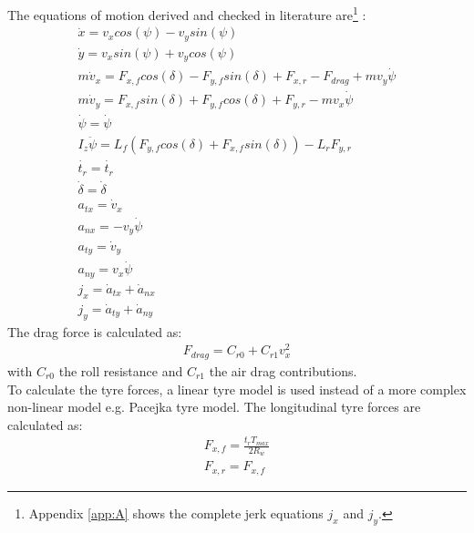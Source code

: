 The equations of motion derived and checked in literature \cite{TongDuySon2019} are\footnote{Appendix \ref{app:A} shows the complete jerk equations $j_x$ and $j_y$.} :
\begin{equation}\label{eq:bicycle_model_eqmotion}
\begin{aligned}
\dot{x} = v_x cos(\psi) - v_y sin(\psi)\\
\dot{y} = v_x sin(\psi) + v_y cos(\psi)\\
m \dot{v}_x = F_{x,f} cos(\delta) - F_{y,f} sin(\delta) + F_{x,r} - F_{drag} + m v_y \dot{\psi}\\
m \dot{v}_y = F_{x,f} sin(\delta) + F_{y,f} cos(\delta) + F_{y,r} - m v_x \dot{\psi}\\
\dot{\psi} = \dot{\psi}\\
I_z \ddot{\psi} = L_f (F_{y,f} cos(\delta) + F_{x,f} sin(\delta)) - L_r F_{y,r}\\
\dot{t_r} = \dot{t_r}\\
\dot{\delta} = \dot{\delta}\\
a_{tx} = \dot{v}_x\\
a_{nx} = -v_y\dot{\psi}\\
a_{ty} = \dot{v}_y\\
a_{ny} = v_x\dot{\psi}\\
j_x = \dot{a}_{tx} + \dot{a}_{nx}\\
j_y = \dot{a}_{ty} + \dot{a}_{ny}
\end{aligned}
\end{equation}
\newpage
The drag force is calculated as:
\begin{equation}\label{eq:bicycle_Fdrag}
\begin{aligned}
F_{drag} = C_{r0} + C_{r1} v_x^2
\end{aligned}
\end{equation}
with $C_{r0}$ the roll resistance and $C_{r1}$ the air drag contributions.\\

To calculate the tyre forces, a linear tyre model is used instead of a more complex non-linear model e.g. Pacejka tyre model. The longitudinal tyre forces are calculated as:
\begin{equation}\label{eq:bicycle_Fx}
\begin{aligned}
F_{x,f} = \frac{t_r T_{max}}{2 R_w}\\
F_{x,r} = F_{x, f}
\end{aligned}
\end{equation}

